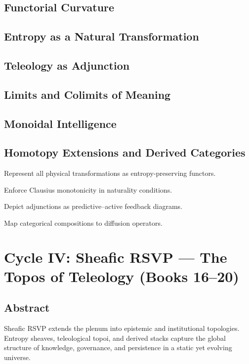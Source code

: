 \documentclass[12pt,oneside]{book}
\begin{document}
\chapter{Functorial Curvature}
\chapter{Entropy as a Natural Transformation}
\chapter{Teleology as Adjunction}
\chapter{Limits and Colimits of Meaning}
\chapter{Monoidal Intelligence}
\chapter{Homotopy Extensions and Derived Categories}

\begin{botinstructions}
  \item Represent all physical transformations as entropy-preserving functors.
  \item Enforce Clausius monotonicity in naturality conditions.
  \item Depict adjunctions as predictive–active feedback diagrams.
  \item Map categorical compositions to diffusion operators.
\end{botinstructions}

\part{Cycle IV: Sheafic RSVP — The Topos of Teleology (Books 16--20)}

\chapter*{Abstract}
Sheafic RSVP extends the plenum into epistemic and institutional topologies.
Entropy sheaves, teleological topoi, and derived stacks capture the global structure
of knowledge, governance, and persistence in a static yet evolving universe.
\end{document}
